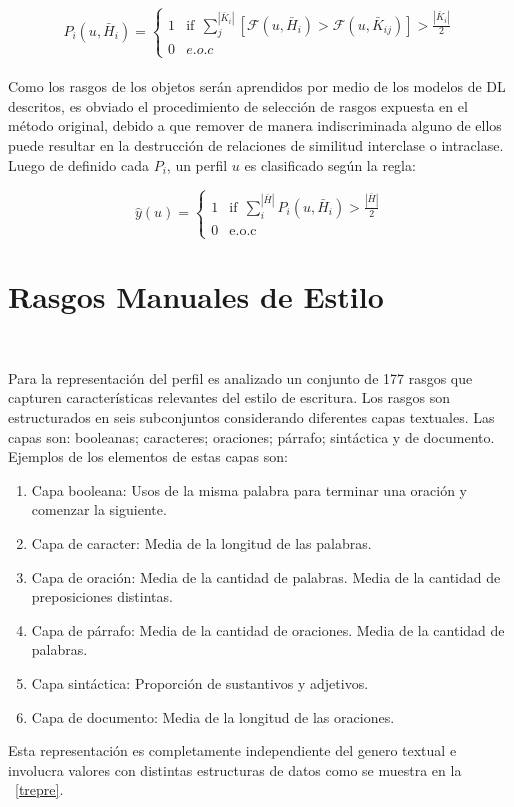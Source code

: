 	\begin{equation*}
	 	P_i(u,  \bar{H}_i) = 
	 	\begin{cases}
	 		1 & \text{if}~~ \sum\limits_{j}^{|\bar{K}_{i}|}[\mathcal{F}(u, \bar{H}_i) > \mathcal{F}(u, \bar{K}_{ij})] > \frac{|\bar{K}_{i}|}{2}\\
	 		0 & e.o.c
	 	\end{cases}
	 \end{equation*}	  
	 \\
	 Como los rasgos de los objetos serán aprendidos por medio de los modelos de DL descritos, es obviado el procedimiento de selección de rasgos expuesta en el método original, debido a que remover de manera indiscriminada alguno de ellos puede resultar en la destrucción de relaciones de similitud interclase o intraclase.
	 \\
	 Luego de definido cada $P_i$, un perfil $u$ es clasificado según la regla:
	 
	\begin{equation*}
	 	\hat{y}(u)  = 
	 	\begin{cases}
	 		1 & \text{if}~~ \sum\limits_{i}^{|\bar{H}|} P_i(u, \bar{H}_i) > \frac{|\bar{H}|}{2}\\
	 		0 & \text{e.o.c}
	 	\end{cases}
	 \end{equation*}	
	 
	 
	 \section{Rasgos Manuales de Estilo}~\label{syle_feat}
	 
	 Para la representación del perfil es analizado un conjunto de 177 rasgos que capturen características relevantes del estilo de escritura. Los rasgos son estructurados en seis subconjuntos considerando diferentes capas textuales. Las capas son: booleanas; caracteres; oraciones; párrafo; sintáctica y de documento.
	 \\
	 Ejemplos de los elementos de estas capas son:	 \\
	 \begin{enumerate}
	 	\item Capa booleana: Usos de la misma palabra para terminar una oración y comenzar la siguiente.
	 	\item Capa de caracter: Media de la longitud de las palabras.
	 	\item Capa de oración: Media de la cantidad de palabras. Media de la cantidad de preposiciones distintas.
	 	\item Capa de párrafo: Media de la cantidad de oraciones. Media de la cantidad de palabras.
	 	\item Capa sintáctica: Proporción de sustantivos y adjetivos.
	 	\item Capa de documento: Media de la longitud de las oraciones.
	 \end{enumerate}
	 Esta representación es completamente independiente del genero textual e involucra valores con distintas estructuras de datos como se muestra en la \figurename~\ref{trepre}.

